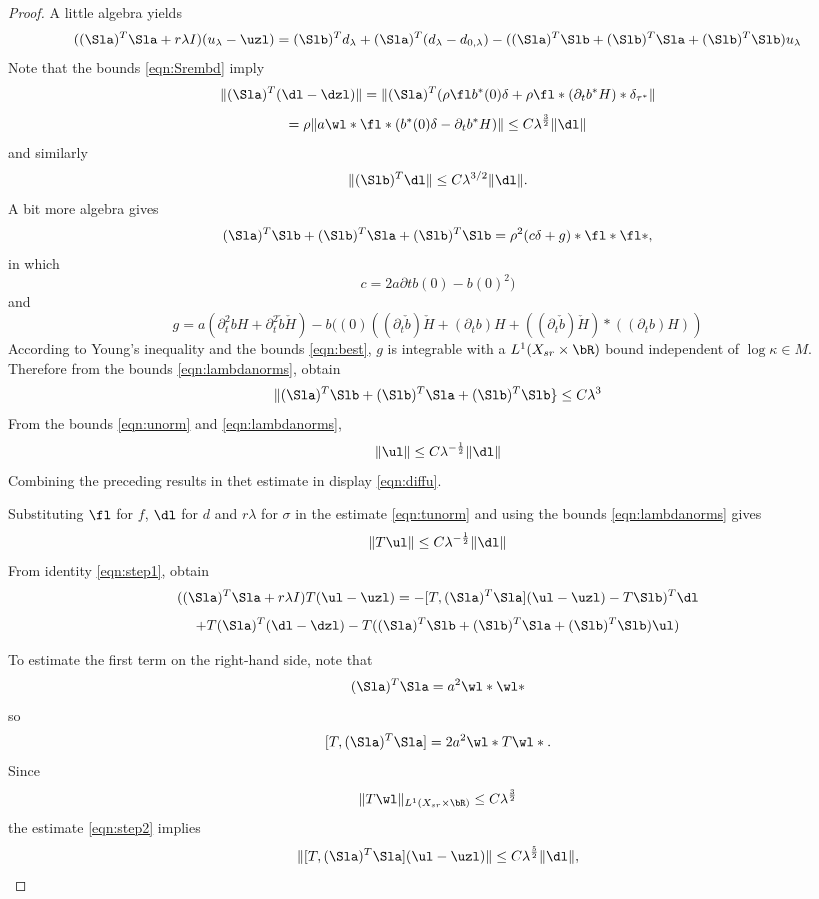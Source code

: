 \begin{proof}
  A little algebra yields
  \begin{equation}
    \label{eqn:step1}
    ((\Sla)^T\Sla + r\lambda I) (u_{\lambda}-\uzl) = (\Slb)^T d_{\lambda} + (\Sla)^T(d_{\lambda}-d_{0,\lambda})- 
    ((\Sla)^T\Slb + (\Slb)^T\Sla + (\Slb)^T\Slb)u_{\lambda}
  \end{equation}
  Note that the bounds \ref{eqn:Srembd} imply
\[
  \|(\Sla)^T (\dl-\dzl)\| = \|(\Sla)^T(\rho \fl b^*(0)\delta +
  \rho \fl*(\partial_tb^*H)*\delta_{\tau^*}\|
\]
\[
  = \rho \|a \wl * \fl * (b^*(0)\delta - \partial_tb^*H)\|
  \le C \lambda^{\frac{3}{2}}\|\dl\|
\]
and similarly
\[
 \| (\Slb)^T\dl \| \le C \lambda^{3/2}\|\dl\|.
\]
A bit more algebra gives
\[
  (\Sla)^T\Slb + (\Slb)^T\Sla + (\Slb)^T\Slb = \rho^2 (c \delta + g) *
  \fl * \fl *,
\]
in which
\[
  c = 2a \partial t b(0) - b(0)^2)
\]
and
\[
  g = a(\partial^2_t b H + \partial^2_t \check{b}\check{H}) -
  b((0)((\partial_t \check{b}) \check{H} + (\partial_t b) H +
  ((\partial_t \check{b}) \check{H})*((\partial_t b)H)) 
\]
According to Young's inequality and the bounds \ref{eqn:best}, $g$ is integrable with a 
$L^1(X_{sr}\times \bR)$ bound independent of $\log \kappa \in
M$. Therefore from the bounds \ref{eqn:lambdanorms}, obtain
\begin{equation}
  \label{eqn:step2}
\|(\Sla)^T\Slb + (\Slb)^T\Sla + (\Slb)^T\Slb\} \le C \lambda^3
\end{equation}
From the bounds \ref{eqn:unorm} and \ref{eqn:lambdanorms},
\begin{equation}
  \label{eqn:ulnorm}
  \|\ul\| \le C \lambda^{-\frac{1}{2}}\|\dl\|
\end{equation}
Combining the preceding results in thet estimate in display
\ref{eqn:diffu}.

Substituting $\fl$ for $f$, $\dl$ for $d$ and $r\lambda$ for $\sigma$ in the estimate \ref{eqn:tunorm} and using
the bounds \ref{eqn:lambdanorms} gives
\begin{equation}
  \label{eqn:step3}
  \|T\ul\| \le C \lambda^{-\frac{1}{2}}\|\dl\|
\end{equation}
From identity \ref{eqn:step1}, obtain
\[
   ((\Sla)^T\Sla + r\lambda I) T(\ul-\uzl) = -[T,
   (\Sla)^T\Sla](\ul-\uzl) - T \Slb)^T \dl 
 \]
\begin{equation}
  \label{eqn:step4}
 + T (\Sla)^T(\dl-\dzl)- 
  T((\Sla)^T\Slb + (\Slb)^T\Sla + (\Slb)^T\Slb)\ul)
\end{equation}

To estimate the first term on the right-hand side, note that
\[
  (\Sla)^T\Sla = a^2 \wl * \wl*
\]
so
\[
  [T,  (\Sla)^T\Sla] = 2 a^2 \wl*T\wl*.
\]
Since
\begin{equation}
  \label{eqn:twl}
  \|T\wl\|_{L^1(X_{sr}\times \bR)} \le C\lambda^{\frac{3}{2}}
\end{equation}
the estimate \ref{eqn:step2} implies
\begin{equation}
  \label{step5}
  \|[T,  (\Sla)^T\Sla](\ul-\uzl)\| \le C \lambda^{\frac{5}{2}}\|\dl\|,
\end{equation}


\end{proof}
